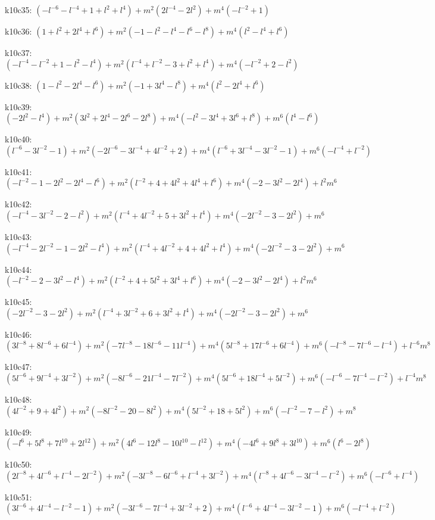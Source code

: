 k10c35: $ (-l^{-6}-l^{-4}+1+l^{2}+l^{4})  +m^{2}(2l^{-4}-2l^{2})  +m^{4}(-l^{-2}+1) $ 

k10c36: $ (1+l^{2}+2l^{4}+l^{6})  +m^{2}(-1-l^{2}-l^{4}-l^{6}-l^{8})  +m^{4}(l^{2}-l^{4}+l^{6}) $ 

k10c37: $ (-l^{-4}-l^{-2}+1-l^{2}-l^{4})  +m^{2}(l^{-4}+l^{-2}-3+l^{2}+l^{4})  +m^{4}(-l^{-2}+2-l^{2}) $ 

k10c38: $ (1-l^{2}-2l^{4}-l^{6})  +m^{2}(-1+3l^{4}-l^{8})  +m^{4}(l^{2}-2l^{4}+l^{6}) $ 

k10c39: $ (-2l^{2}-l^{4})  +m^{2}(3l^{2}+2l^{4}-2l^{6}-2l^{8})  +m^{4}(-l^{2}-3l^{4}+3l^{6}+l^{8})  +m^{6}(l^{4}-l^{6}) $ 

k10c40: $ (l^{-6}-3l^{-2}-1)  +m^{2}(-2l^{-6}-3l^{-4}+4l^{-2}+2)  +m^{4}(l^{-6}+3l^{-4}-3l^{-2}-1)  +m^{6}(-l^{-4}+l^{-2}) $ 

k10c41: $ (-l^{-2}-1-2l^{2}-2l^{4}-l^{6})  +m^{2}(l^{-2}+4+4l^{2}+4l^{4}+l^{6})  +m^{4}(-2-3l^{2}-2l^{4})  +l^{2}m^{6} $ 

k10c42: $ (-l^{-4}-3l^{-2}-2-l^{2})  +m^{2}(l^{-4}+4l^{-2}+5+3l^{2}+l^{4})  +m^{4}(-2l^{-2}-3-2l^{2})  +m^{6} $ 

k10c43: $ (-l^{-4}-2l^{-2}-1-2l^{2}-l^{4})  +m^{2}(l^{-4}+4l^{-2}+4+4l^{2}+l^{4})  +m^{4}(-2l^{-2}-3-2l^{2})  +m^{6} $ 

k10c44: $ (-l^{-2}-2-3l^{2}-l^{4})  +m^{2}(l^{-2}+4+5l^{2}+3l^{4}+l^{6})  +m^{4}(-2-3l^{2}-2l^{4})  +l^{2}m^{6} $ 

k10c45: $ (-2l^{-2}-3-2l^{2})  +m^{2}(l^{-4}+3l^{-2}+6+3l^{2}+l^{4})  +m^{4}(-2l^{-2}-3-2l^{2})  +m^{6} $ 

k10c46: $ (3l^{-8}+8l^{-6}+6l^{-4})  +m^{2}(-7l^{-8}-18l^{-6}-11l^{-4})  +m^{4}(5l^{-8}+17l^{-6}+6l^{-4})  +m^{6}(-l^{-8}-7l^{-6}-l^{-4})  +l^{-6}m^{8} $ 

k10c47: $ (5l^{-6}+9l^{-4}+3l^{-2})  +m^{2}(-8l^{-6}-21l^{-4}-7l^{-2})  +m^{4}(5l^{-6}+18l^{-4}+5l^{-2})  +m^{6}(-l^{-6}-7l^{-4}-l^{-2})  +l^{-4}m^{8} $ 

k10c48: $ (4l^{-2}+9+4l^{2})  +m^{2}(-8l^{-2}-20-8l^{2})  +m^{4}(5l^{-2}+18+5l^{2})  +m^{6}(-l^{-2}-7-l^{2})  +m^{8} $ 

k10c49: $ (-l^{6}+5l^{8}+7l^{10}+2l^{12})  +m^{2}(4l^{6}-12l^{8}-10l^{10}-l^{12})  +m^{4}(-4l^{6}+9l^{8}+3l^{10})  +m^{6}(l^{6}-2l^{8}) $ 

k10c50: $ (2l^{-8}+4l^{-6}+l^{-4}-2l^{-2})  +m^{2}(-3l^{-8}-6l^{-6}+l^{-4}+3l^{-2})  +m^{4}(l^{-8}+4l^{-6}-3l^{-4}-l^{-2})  +m^{6}(-l^{-6}+l^{-4}) $ 

k10c51: $ (3l^{-6}+4l^{-4}-l^{-2}-1)  +m^{2}(-3l^{-6}-7l^{-4}+3l^{-2}+2)  +m^{4}(l^{-6}+4l^{-4}-3l^{-2}-1)  +m^{6}(-l^{-4}+l^{-2}) $ 

